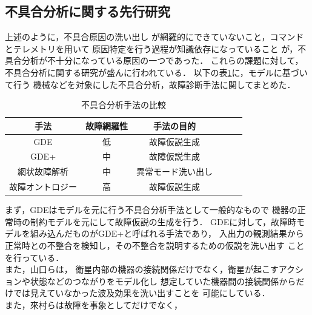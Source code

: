 \documentclass[11pt]{jsreport}
\begin{document}
\subsection{不具合分析に関する先行研究}
上述のように，不具合原因の洗い出し
が網羅的にできていないこと，コマンドとテレメトリを用いて
原因特定を行う過程が知識依存になっていること
が，不具合分析が不十分になっている原因の一つであった．%
これらの課題に対して，不具合分析に関する研究が盛んに行われている．
以下の表\ref{tab:previous_research}に，モデルに基づいて行う
機械などを対象にした不具合分析，故障診断手法に関してまとめた．
\begin{table}[H]
   \centering
   \caption{不具合分析手法の比較}
   \label{tab:previous_research}
      \begin{tabular}{cccccc} \hline%
         手法&故障網羅性&手法の目的%
         \\ \hline
         GDE&低&故障仮説生成%
         \\ %
         GDE+\cite{Struss1989}&中&故障仮説生成%
         \\
         網状故障解析\cite{Yamaguchi2014}&中&異常モード洗い出し%
         \\
         故障オントロジー\cite{Kitamura1999}&高&故障仮説生成%
         \\ \hline
      \end{tabular}
\end{table}
まず，GDEはモデルを元に行う不具合分析手法として一般的なもので
機器の正常時の制約モデルを元にして故障仮説の生成を行う．
GDEに対して，故障時モデルを組み込んだものがGDE+\cite{Struss1989}と呼ばれる手法であり，
入出力の観測結果から正常時との不整合を検知し，その不整合を説明するための仮説を洗い出す
ことを行っている．\\
また，山口ら\cite{Yamaguchi2014}は，
衛星内部の機器の接続関係だけでなく，衛星が起こすアクションや状態などのつながりをモデル化し
想定していた機器間の接続関係からだけでは見えていなかった波及効果を洗い出すことを
可能にしている．\\
また，來村ら\cite{Kitamura1999}は故障を事象としてだけでなく，
\end{document}
